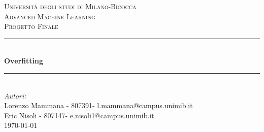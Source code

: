 \begin{titlepage}

\newcommand{\HRule}{\rule{\linewidth}{0.5mm}} %

\center %
 

\textsc{\LARGE Università degli studi di Milano-Bicocca}\\[1cm] %
\textsc{\Large Advanced Machine Learning }\\[0.3cm] %
\textsc{\large Progetto Finale}\\[0.1cm] %


\HRule \\[0.4cm]
{ \huge \bfseries Overfitting}\\[0.4cm] %
\HRule \\[1.5cm]
 

\large
\emph{Autori:}\\
Lorenzo Mammana - 807391- l.mammana@campus.unimib.it \\   %
Eric Nisoli - 807147- e.nisoli1@campus.unimib.it   \\[1cm] %



{\large \today}\\[2cm] %


\end{titlepage}
